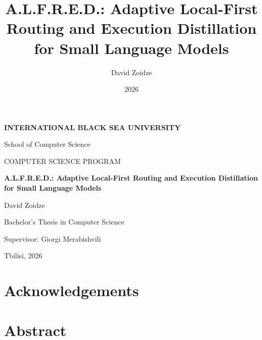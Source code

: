 \documentclass[12pt,a4paper,oneside]{report}
\title{A.L.F.R.E.D.: Adaptive Local-First Routing and Execution
Distillation for Small Language Models}
\author{David Zoidze}
\date{2026}
\begin{document}
\begin{titlepage}
\centering
\vspace*{1.5cm}
{\large\bfseries INTERNATIONAL BLACK SEA UNIVERSITY\par}
\vspace{0.25cm}
{\large School of Computer Science\par}
{\large COMPUTER SCIENCE PROGRAM\par}
\vfill
{\large\bfseries A.L.F.R.E.D.: Adaptive Local-First Routing and Execution
Distillation for Small Language Models\par}
\vfill
{\large David Zoidze\par}
\vspace{0.5cm}
{\large Bachelor's Thesis in Computer Science\par}
\vspace{0.5cm}
{\large Supervisor: Giorgi Merabishvili\par}
\vfill
{\large Tbilisi, 2026\par}
\end{titlepage}


\tableofcontents

\chapter*{Acknowledgements}


\chapter*{Abstract}


% 
\end{document}
